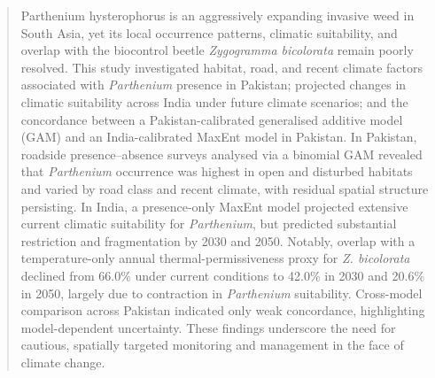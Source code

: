 \begin{abstract}
Parthenium hysterophorus is an aggressively expanding invasive weed in South Asia, yet its local occurrence patterns, climatic suitability, and overlap with the biocontrol beetle \textit{Zygogramma bicolorata} remain poorly resolved. This study investigated habitat, road, and recent climate factors associated with \textit{Parthenium} presence in Pakistan; projected changes in climatic suitability across India under future climate scenarios; and the concordance between a Pakistan-calibrated generalised additive model (GAM) and an India-calibrated MaxEnt model in Pakistan. In Pakistan, roadside presence--absence surveys analysed via a binomial GAM revealed that \textit{Parthenium} occurrence was highest in open and disturbed habitats and varied by road class and recent climate, with residual spatial structure persisting. In India, a presence-only MaxEnt model projected extensive current climatic suitability for \textit{Parthenium}, but predicted substantial restriction and fragmentation by 2030 and 2050. Notably, overlap with a temperature-only annual thermal-permissiveness proxy for \textit{Z. bicolorata} declined from 66.0\% under current conditions to 42.0\% in 2030 and 20.6\% in 2050, largely due to contraction in \textit{Parthenium} suitability. Cross-model comparison across Pakistan indicated only weak concordance, highlighting model-dependent uncertainty. These findings underscore the need for cautious, spatially targeted monitoring and management in the face of climate change.
\end{abstract}